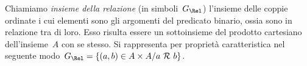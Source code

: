 \begin{definizione}
Chiamiamo \emph{insieme della relazione} (in simboli~\(G_\Rel\)) l'insieme 
delle 
coppie ordinate i cui
elementi sono gli argomenti del predicato binario, ossia sono in relazione tra 
di loro. Esso risulta essere un
sottoinsieme del prodotto cartesiano dell'insieme~\(A\) con se stesso. Si 
rappresenta per proprietà caratteristica nel
seguente modo~\(G_\Rel = \lbrace (a,b) \in A \times A / a \srel b \rbrace\).
\end{definizione}


\begin{comment}
 
\subsection{Rappresentazioni di una relazione}
\label{subsec:rel_rappresentazione}

\subsubsection{Grafico di una relazione}

Dal momento che una relazione in un insieme~\(Y\) determina un sottoinsieme del 
prodotto cartesiano~\(Y \times Y\) è
comodo rappresentare una relazione nello stesso diagramma usato per 
rappresentare il prodotto cartesiano.
Una relazione può quindi essere rappresentata attraverso un \emph{grafico 
cartesiano}.


\subsubsection{Matrice o tabella di una relazione}

Nella figura~\ref{fig:B.1} è rappresentata la classica griglia per il gioco 
della battaglia navale.
Ogni cella è individuata da una coppia ordinata il cui primo elemento (una 
lettera dell'alfabeto) indica la riga,
il secondo (un numero) indica la colonna; così la coppia~\((D,5)\) indica la 
cella 
annerita.



\subsubsection{Grafo di una relazione}


\end{comment}
